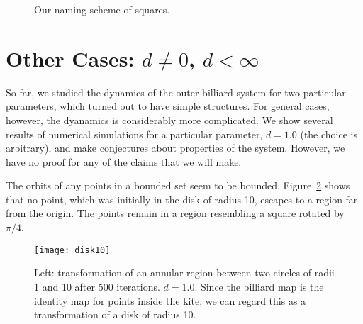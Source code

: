\documentclass[12pt,twoside]{book}
\begin{document}
\begin{figure}[ht]
  \centering

  \caption{Our naming scheme of squares.}
  \label{fig:grid}

\end{figure}

\section{Other Cases: $d \neq 0$, $d < \infty$}
So far, we studied the dynamics of the outer billiard system for two particular parameters, which turned out to have simple structures.
For general cases, however, the dyanamics is considerably more complicated.
We show several results of numerical simulations for a particular parameter, $d = 1.0$ (the choice is arbitrary), and make conjectures about properties of the system.
However, we have no proof for any of the claims that we will make.


The orbits of any points in a bounded set seem to be bounded.
Figure~\ref{fig:disk10} shows that no point, which was initially in the disk of radius 10, escapes to a region far from the origin.
The points remain in a region resembling a square rotated by $\pi/4$.
\begin{figure}[ht]
  \begin{center}
    \texttt{[image: disk10]}
    \caption{Left: transformation of an annular region between two circles of radii 1 and 10 after 500 iterations.
      $d = 1.0$.
      Since the billiard map is the identity map for points inside the kite, we can regard this as a transformation of a disk of radius 10.
    }
    \label{fig:disk10}
  \end{center}
\end{figure}
\end{document}

